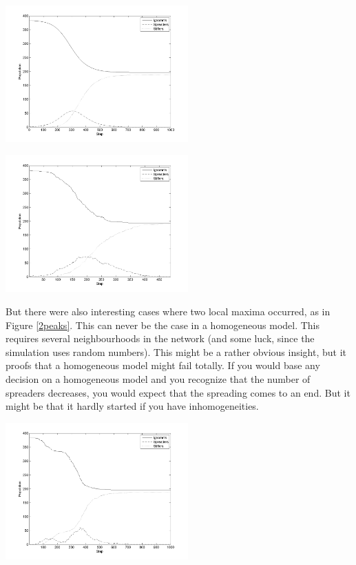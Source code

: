 \begin{minipage}{0.5\textwidth}
\includegraphics[width=7cm]{NICE_SIR}
\end{minipage}
\begin{minipage}{0.5\textwidth}
\includegraphics[width=7cm]{1-local-max}
\end{minipage}
\label{evolution1}


\begin{minipage}{0.5\textwidth}
But there were also interesting cases where two local maxima occurred, as in Figure \ref{2peaks}. This can never be the case in a homogeneous model. This requires several neighbourhoods in the network (and some luck, since the simulation uses random numbers). This might be a rather obvious insight, but it proofs that a homogeneous model might fail totally. If you would base any decision on a homogeneous model and you recognize that the number of spreaders decreases, you would expect that the spreading comes to an end. But it might be  that it hardly started if you have inhomogeneities.
\end{minipage}
\begin{minipage}{0.5\textwidth}
\includegraphics[width=7cm]{2-local-max}
\label{2peaks}
\end{minipage}




